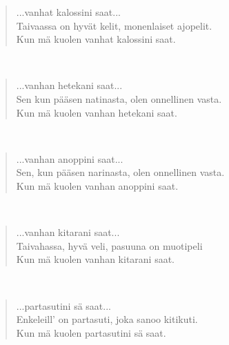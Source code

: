 \noindent\begin{minipage}{\linewidth}
\begin{verse}
	...vanhat kalossini saat...\\
	Taivaassa on hyvät kelit, monenlaiset ajopelit.\\
	Kun mä kuolen vanhat kalossini saat.\\
\end{verse}
\end{minipage}\\[10pt]
\noindent\begin{minipage}{\linewidth}
\begin{verse}
	...vanhan hetekani saat...\\
	Sen kun pääsen natinasta, olen onnellinen vasta.\\
	Kun mä kuolen vanhan hetekani saat.\\
\end{verse}
\end{minipage}\\[10pt]
\noindent\begin{minipage}{\linewidth}
\begin{verse}
	...vanhan anoppini saat...\\
	Sen, kun pääsen narinasta, olen onnellinen vasta.\\
	Kun mä kuolen vanhan anoppini saat.\\
\end{verse}
\end{minipage}\\[10pt]
\noindent\begin{minipage}{\linewidth}
\begin{verse}
	...vanhan kitarani saat...\\
	Taivahassa, hyvä veli, pasuuna on muotipeli\\
	Kun mä kuolen vanhan kitarani saat.\\
\end{verse}
\end{minipage}\\[10pt]
\noindent\begin{minipage}{\linewidth}
\begin{verse}
	...partasutini sä saat...\\
	Enkeleill' on partasuti, joka sanoo kitikuti.\\
	Kun mä kuolen partasutini sä saat.\\
\end{verse}
\end{minipage}\\[10pt]

